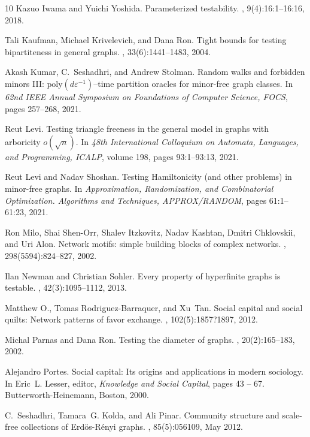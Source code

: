 \documentclass{article}
\newcommand{\poly}{\textrm{poly}}
\begin{document}
\begin{thebibliography}{10}
Kazuo Iwama and Yuichi Yoshida.
\newblock Parameterized testability.
, 9(4):16:1--16:16, 2018.

Tali Kaufman, Michael Krivelevich, and Dana Ron.
\newblock Tight bounds for testing bipartiteness in general graphs.
, 33(6):1441--1483, 2004.

Akash Kumar, C.~Seshadhri, and Andrew Stolman.
\newblock Random walks and forbidden minors {III}:
  $\poly(d\varepsilon^{-1})$--time partition oracles for minor-free graph
  classes.
\newblock In {\em 62nd {IEEE} Annual Symposium on Foundations of Computer
  Science, {FOCS}}, pages 257--268, 2021.

Reut Levi.
\newblock Testing triangle freeness in the general model in graphs with
  arboricity $o(\sqrt{n})$.
\newblock In {\em 48th International Colloquium on Automata, Languages, and
  Programming, {ICALP}}, volume 198, pages 93:1--93:13, 2021.

Reut Levi and Nadav Shoshan.
\newblock Testing {H}amiltonicity (and other problems) in minor-free graphs.
\newblock In {\em Approximation, Randomization, and Combinatorial Optimization.
  Algorithms and Techniques, {APPROX/RANDOM}}, pages 61:1--61:23, 2021.

Ron Milo, Shai Shen-Orr, Shalev Itzkovitz, Nadav Kashtan, Dmitri Chklovskii,
  and Uri Alon.
\newblock Network motifs: simple building blocks of complex networks.
, 298(5594):824--827, 2002.

Ilan Newman and Christian Sohler.
\newblock Every property of hyperfinite graphs is testable.
, 42(3):1095--1112, 2013.

Matthew O., Tomas Rodriguez-Barraquer, and Xu~Tan.
\newblock Social capital and social quilts: Network patterns of favor exchange.
, 102(5):1857?1897, 2012.

Michal Parnas and Dana Ron.
\newblock Testing the diameter of graphs.
, 20(2):165--183, 2002.

Alejandro Portes.
\newblock Social capital: Its origins and applications in modern sociology.
\newblock In Eric~L. Lesser, editor, {\em Knowledge and Social Capital}, pages
  43 -- 67. Butterworth-Heinemann, Boston, 2000.

C.~Seshadhri, Tamara~G. Kolda, and Ali Pinar.
\newblock Community structure and scale-free collections of {Erd\"os-R\'enyi}
  graphs.
, 85(5):056109, May 2012.

\end{thebibliography}
\end{document}
